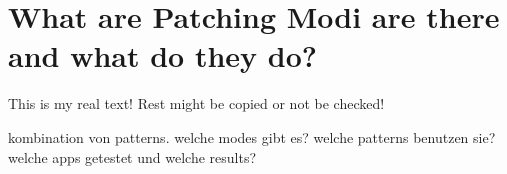 \section{What are Patching Modi are there and what do they do?} \label{section:luckypatcher-modi}
This is my real text! Rest might be copied or not be checked!


kombination von patterns.\newline
welche modes gibt es? welche patterns benutzen sie?\newline
welche apps getestet und welche results?
